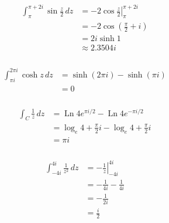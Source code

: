 \documentclass{article}
\newcommand{\Ln}{\operatorname{Ln}}
\begin{document}
\subsubsection{}

\begin{align*}
  \int_{\pi}^{\pi + 2 i} \sin \frac{z}{2} \,d z & = \left. -2 \cos \frac{z}{2} \right|_\pi^{\pi + 2 i} \\
                                                & = -2 \cos \left( \frac{\pi}{2} + i \right)           \\
                                                & = 2 i \sinh 1                                        \\
                                                & \approx 2.3504 i
\end{align*}

\setcounter{subsubsection}{14}
\subsubsection{}

\begin{align*}
  \int_{\pi i}^{2 \pi i} \cosh z \,d z & = \sinh (2 \pi i) - \sinh (\pi i) \\
                                       & = 0
\end{align*}

\setcounter{subsubsection}{16}
\subsubsection{}

\begin{align*}
  \int_C \frac{1}{z} \,d z & = \Ln 4 e^{\pi i / 2} - \Ln 4 e^{-\pi i / 2}              \\
                           & = \log_e 4 + \frac{\pi}{2} i - \log_e 4 + \frac{\pi}{2} i \\
                           & = \pi i
\end{align*}

\setcounter{subsubsection}{18}
\subsubsection{}

\begin{align*}
  \int_{-4 i}^{4 i} \frac{1}{z^2} \,d z & = \left. -\frac{1}{z} \right|_{-4 i}^{4 i} \\
                                        & = -\frac{1}{4 i} - \frac{1}{4 i}           \\
                                        & = -\frac{1}{2 i}                           \\
                                        & = \frac{i}{2}
\end{align*}
\end{document}
